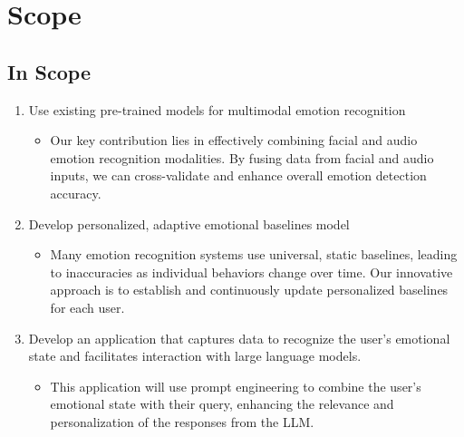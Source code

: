 \section{Scope}
\subsection{In Scope}
\begin{enumerate}
    \item Use existing pre-trained models for multimodal emotion recognition
        \begin{itemize}
            \item Our key contribution lies in effectively combining facial and audio emotion recognition modalities. By fusing data from facial and audio inputs, we can cross-validate and enhance overall emotion detection accuracy.
        \end{itemize}
    \item Develop personalized, adaptive emotional baselines model
        \begin{itemize}
            \item Many emotion recognition systems use universal, static baselines, leading to inaccuracies as individual behaviors change over time. Our innovative approach is to establish and continuously update personalized baselines for each user.
        \end{itemize}
    \item Develop an application that captures data to recognize the user's emotional state and facilitates interaction with large language models.
        \begin{itemize}
            \item This application will use prompt engineering to combine the user's emotional state with their query, enhancing the relevance and personalization of the responses from the LLM.
        \end{itemize}
\end{enumerate}

